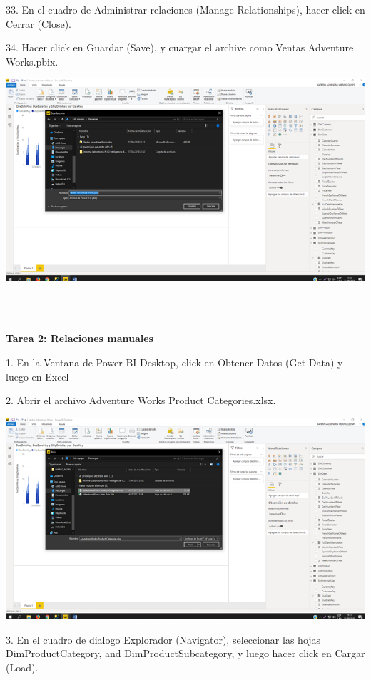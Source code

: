 \item 33. En el cuadro de Administrar relaciones (Manage Relationships), hacer click en Cerrar (Close).
\item 34. Hacer click en Guardar (Save), y cuargar el archive como Ventas Adventure Works.pbix. 
\begin{center}
\includegraphics[width=15cm]{./Imagenes/img17} 
\end{center}
\\\\
\item \textbf{Tarea 2: Relaciones manuales}

\item 1. En la Ventana de Power BI Desktop, click en Obtener Datos (Get Data) y luego en Excel
\item 2. Abrir el archivo Adventure Works Product Categories.xlsx.

\begin{center}
\includegraphics[width=15cm]{./Imagenes/img18} 
\end{center}

\item 3. En el cuadro de dialogo Explorador (Navigator), seleccionar las hojas DimProductCategory, and
DimProductSubcategory, y luego hacer click en Cargar (Load).

